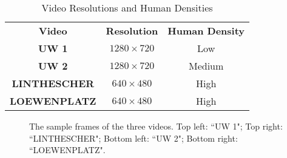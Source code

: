 \documentclass[journal]{IEEEtran}
\begin{document}
\begin{table}[t]
\renewcommand{\arraystretch}{1.3}
\caption{Video Resolutions and Human Densities}
\begin{center}
\begin{tabular}{|c!{\vrule width 2pt}c|c|}
\hline
\textbf{Video} & \textbf{Resolution} & \textbf{Human Density} \\ 
\textbf{UW 1} &$1280\times720$ &Low \\ \hline
\textbf{UW 2} &$1280\times720$ &Medium \\ \hline 
\textbf{LINTHESCHER} &$640\times480$ &High \\ \hline
\textbf{LOEWENPLATZ} &$640\times480$ &High \\
\hline
\end{tabular}
\end{center}
\label{Table: video}
\end{table}

\begin{figure}[t]
\caption{The sample frames of the three videos. Top left: ``UW 1"; Top right: ``LINTHESCHER"; Bottom left: ``UW 2"; Bottom right: ``LOEWENPLATZ".}
\label{fig:sampleFrames}
\end{figure}
\end{document}
